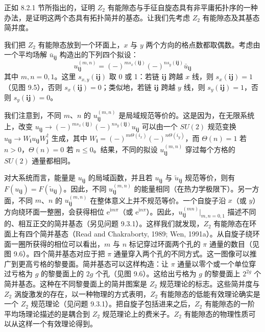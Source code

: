 正如 8.2.1 节所指出的，证明 $Z_2$ 有能隙态与手征自旋态具有非平庸拓扑序的一种办法，是证明这两个态具有拓扑简并的基态。让我们先考虑 $Z_2$ 有能隙态及其基态简并度。

我们把 $Z_2$ 有能隙态放到一个环面上，$x$ 与 $y$ 两个方向的格点数都取偶数。考虑由一个平均场解 $\bar{u}_{\pmb{ij}}$ 构造出的下列四个拟设：
\begin{equation*}
u_{\pmb{ij}}^{(m,n)}=(-)^{m s_x(\pmb{ij})}(-)^{n s_y(\pmb{ij})}\bar{u}_{\pmb{ij}}
\tag{9.3.1}
\end{equation*}
其中 $m,n=0,1$。这里 $s_{x,y}(\pmb{ij})$ 取 0 或 1：若链 $\pmb{ij}$ 跨越 $x$ 线，则 $s_x(\pmb{ij})=1$（见图 9.5），否则 $s_x(\pmb{ij})=0$；类似地，若链 $\pmb{ij}$ 跨越 $y$ 线，则 $s_y(\pmb{ij})=1$，否则 $s_y(\pmb{ij})=0$。

我们注意到，不同 $m$、$n$ 的 $u_{\pmb{ij}}^{(m,n)}$ 是局域规范等价的。这是因为，在无限系统上，改变 $u_{\pmb{ij}}\to(-)^{m s_x(\pmb{ij})}(-)^{n s_y(\pmb{ij})}u_{\pmb{ij}}$ 可以由一个 $SU(2)$ 规范变换 $u_{\pmb{ij}}\to W_{\pmb{i}}u_{\pmb{ij}}W_{\pmb{j}}^{\dagger}$ 生成，其中 $W_{\pmb{i}}=(-)^{m\Theta(i_x)}(-)^{n\Theta(i_y)}$，而 $\Theta(n)=1$ 若 $n>0$，$\Theta(n)=0$ 若 $n\leqslant0$。结果，不同的拟设 $u_{\pmb{ij}}^{(m,n)}$ 穿过每个方格的 $SU(2)$ 通量都相同。

对大系统而言，能量是 $u_{\pmb{ij}}$ 的局域函数，并且若 $u_{\pmb{ij}}$ 与 $\tilde{u}_{\pmb{ij}}$ 规范等价，则有 $F(u_{\pmb{ij}})=F(\tilde{u}_{\pmb{ij}})$。因此，不同 $u_{\pmb{ij}}^{(m,n)}$ 的能量相同（在热力学极限下）。另一方面，不同 $m$、$n$ 的 $u_{\pmb{ij}}^{(m,n)}$ 在整体意义上并不规范等价。一个自旋子沿 $x$（或 $y$）方向绕环面一整圈，会获得相位 $\mathrm{e}^{\mathrm{i}m\pi}$（或 $\mathrm{e}^{\mathrm{i}n\pi}$）。因此，$u_{\pmb{ij}}^{(mn)}\big|_{m,n=0,1}$ 描述不同的、相互正交的简并基态（另见问题 9.3.1）。这样我们就发现，$Z_2$ 有能隙态在环面上有四个简并基态（Read and Chakraborty, 1989; Wen, 1991a）。从自旋子绕环面一圈所获得的相位可以看出，$m$ 与 $n$ 标记穿过环面两个孔的 $\pi$ 通量的数目（见图 9.6）。四个简并基态对应于把 $\pi$ 通量穿入两个孔的不同方式。这一图像可以推广到更高亏格的黎曼面。简并基态可以这样构造：让 $\pi$ 通量以零个或一个单位穿过亏格为 $g$ 的黎曼面上的 $2g$ 个孔（见图 9.6）。这给出亏格为 $g$ 的黎曼面上 $2^{2g}$ 个简并基态。这种在不同黎曼面上的简并图案是 $Z_2$ 规范理论的标志。这些简并度与 $Z_2$ 涡旋激发的存在，以一种物理的方式表明，$Z_2$ 有能隙态的低能有效理论确实是一个 $Z_2$ 规范理论（见问题 9.3.1）。把自旋子包括进来之后，$Z_2$ 有能隙态的一阶平均场理论描述的是耦合到 $Z_2$ 规范理论上的费米子。$Z_2$ 有能隙态的物理性质可以从这样一个有效理论得到。

